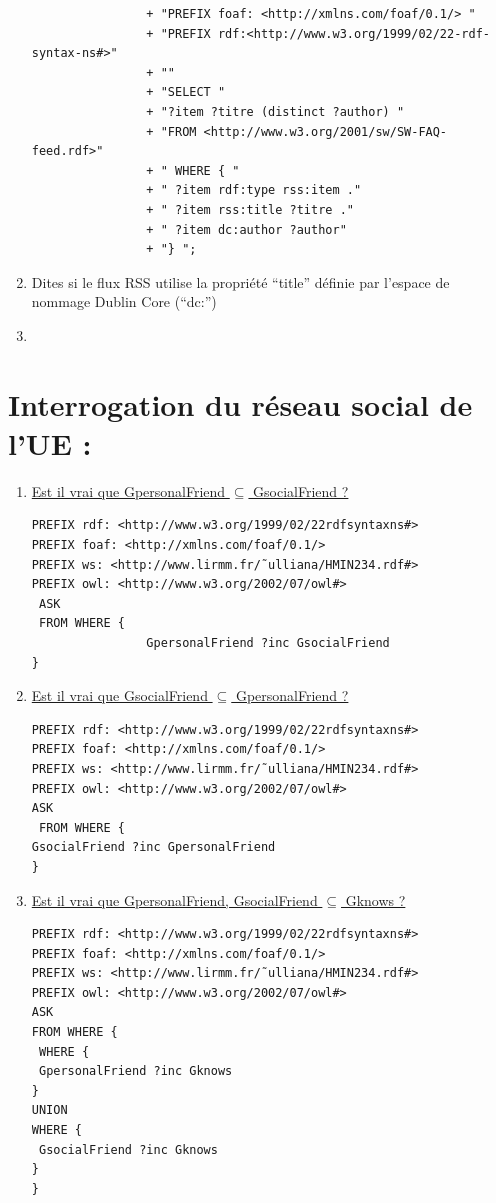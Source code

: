 \documentclass[12pt,a4paper]{article}
\begin{document}
\begin{justify}
\begin{enumerate}
\begin{verbatim}
                + "PREFIX foaf: <http://xmlns.com/foaf/0.1/> "
                + "PREFIX rdf:<http://www.w3.org/1999/02/22-rdf-syntax-ns#>"
                + ""
                + "SELECT "
                + "?item ?titre (distinct ?author) "
                + "FROM <http://www.w3.org/2001/sw/SW-FAQ-feed.rdf>"
                + " WHERE { "
                + " ?item rdf:type rss:item ."
                + " ?item rss:title ?titre ."
                + " ?item dc:author ?author"
                + "} ";
            \end{verbatim}
            \item Dites si le flux RSS utilise la propri\'et\'e “title” d\'efinie par l\rq{espace} de nommage Dublin Core (“dc:”)

            \item
        \end{enumerate}
    \end{justify}


    \section{Interrogation du réseau social de l'UE :}
    \begin{justify}
        \begin{enumerate}
            \item \underline{Est il vrai que GpersonalFriend $\subseteq$ GsocialFriend ?}
            \begin{verbatim}
PREFIX rdf: <http://www.w3.org/1999/02/22rdfsyntaxns#>
PREFIX foaf: <http://xmlns.com/foaf/0.1/> 
PREFIX ws: <http://www.lirmm.fr/˜ulliana/HMIN234.rdf#> 
PREFIX owl: <http://www.w3.org/2002/07/owl#>
 ASK
 FROM WHERE {
                GpersonalFriend ?inc GsocialFriend 
}

            \end{verbatim}
            \item \underline{Est il vrai que GsocialFriend $\subseteq$ GpersonalFriend ?}
            \begin{verbatim}
PREFIX rdf: <http://www.w3.org/1999/02/22rdfsyntaxns#>
PREFIX foaf: <http://xmlns.com/foaf/0.1/> 
PREFIX ws: <http://www.lirmm.fr/˜ulliana/HMIN234.rdf#> 
PREFIX owl: <http://www.w3.org/2002/07/owl#>
ASK
 FROM WHERE { 
GsocialFriend ?inc GpersonalFriend 
}
            \end{verbatim}
            \item \underline{Est il vrai que GpersonalFriend, GsocialFriend $\subseteq$ Gknows ?}
            \begin{verbatim}
PREFIX rdf: <http://www.w3.org/1999/02/22rdfsyntaxns#>
PREFIX foaf: <http://xmlns.com/foaf/0.1/>
PREFIX ws: <http://www.lirmm.fr/˜ulliana/HMIN234.rdf#>
PREFIX owl: <http://www.w3.org/2002/07/owl#>
ASK
FROM WHERE {
 WHERE {
 GpersonalFriend ?inc Gknows
}
UNION
WHERE {
 GsocialFriend ?inc Gknows
}
}

            \end{verbatim}
        \end{enumerate}
    \end{justify}
\end{document}
